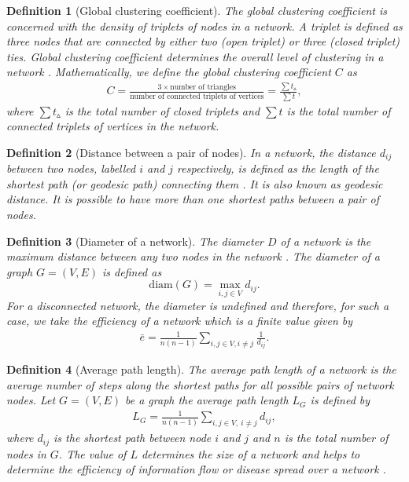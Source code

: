 \documentclass[10pt,a4paper]{article}
\newtheorem{defn}{Definition}
\begin{document}
\begin{defn}[Global clustering coefficient]
	The global clustering coefficient is concerned with the density of triplets of nodes in a network. A triplet is defined as three nodes that are connected by either two (open triplet) or three (closed triplet) ties. Global clustering coefficient determines the overall level of clustering in a network \citep{opsahl2009clustering}.
	Mathematically, we define the global clustering coefficient $C$ as
	\begin{eqnarray}
	C = \frac{3 \times \text{number of triangles}}{\text{number of connected triplets of vertices}} = \frac{\sum t_\vartriangle}{\sum t},
	\end{eqnarray}
	where $\sum t_\vartriangle$ is the total number of closed triplets and $\sum t$ is the total number of connected triplets of vertices in the network.
\end{defn}


\begin{defn}[Distance between a pair of nodes]
	In a network, the distance $d_{ij}$ between two nodes, labelled $i$ and $j$ respectively, is defined as the length of the shortest path (or geodesic path) connecting them \citep{wang2003complex}. It is also known as geodesic distance. It is possible to have more than one shortest paths between a pair of nodes.
\end{defn}
\begin{defn}[Diameter of a network]
	The diameter $D$ of a network is the maximum distance between any two
	nodes in the network \citep{wang2003complex}. The diameter of a graph $G= (V,E )$ is defined as \[ \text{diam}(G ) = \max_{i,j \in V} d_{ij}.\] For a disconnected network, the diameter is undefined and therefore, for such a case, we take the efficiency of a network which is a finite value given by
	\begin{eqnarray*}
		\bar{e} =\frac{1}{n(n-1)} \sum_{i,j \in V,i\neq j} \frac{1}{d_{ij}}.
		\label{eqn:eff}
	\end{eqnarray*}
\end{defn}

\begin{defn}[Average path length]
	The average path length of a network is the average number of steps along the shortest paths for all possible pairs of network nodes. Let $G = (V , E )$ be a graph the average path length $L_G$ is defined by
	\begin{eqnarray}
	L_G = \frac{1}{n(n-1)} \sum_{i,j \in V,~i \neq j} d_{ij},
	\end{eqnarray}
	where $d_{ij}$ is the shortest path between node $i$ and $j$ and $n$ is the total number of nodes in $G$. The value of $L$ determines the size of a network and helps to determine the efficiency of information flow or disease spread over a network \citep{wang2003complex}.
\end{defn}
\end{document}
